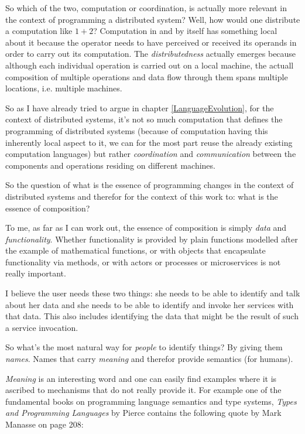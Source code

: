 So which of the two, computation or coordination, is actually
more relevant in the context of programming a distributed system?
Well, how would one distribute a computation like $1 + 2$?
Computation in and by itself has something local about it because
the operator needs to have perceived or received its operands in
order to carry out its computation. The \textit{distributedness}
actually emerges because although each individual operation is
carried out on a local machine, the actuall composition of multiple
operations and data flow through them spans multiple locations, i.e.
multiple machines.

So as I have already tried to argue in chapter \ref{LanguageEvolution},
for the context of distributed systems, it's not so much computation
that defines the programming of distributed systems (because
of computation having this inherently local aspect to it, we
can for the most part reuse the already existing computation languages)
but rather \textit{coordination} and \textit{communication} between
the components and operations residing on different machines.
\newline

So the question of what is the essence of programming
changes in the context of distributed systems and therefor for the
context of this work to: what is the essence of composition?
\newline

To me, as far as I can work out, the essence of composition
is simply \textit{data} and \textit{functionality}. Whether
functionality is provided by plain functions modelled after
the example of mathematical functions, or with objects that
encapsulate functionality via methods, or with actors or
processes or microservices is not really important.

I believe the user needs these two things: she needs to be
able to identify and talk about her data and she needs to be
able to identify and invoke her services with that data.
This also includes identifying the data that might be the
result of such a service invocation.

So what's the most natural way for \textit{people} to identify things?
By giving them \textit{names}. Names that carry \textit{meaning}
and therefor provide semantics (for humans).
\newline

\textit{Meaning} is an interesting word and one can easily find examples
where it is ascribed to mechanisms that do not really provide it.
For example one of the fundamental books on programming language
semantics and type systems, \textit{Types and Programming Languages}
by Pierce \cite{pierce} contains the following quote by Mark Manasse
on page 208:

